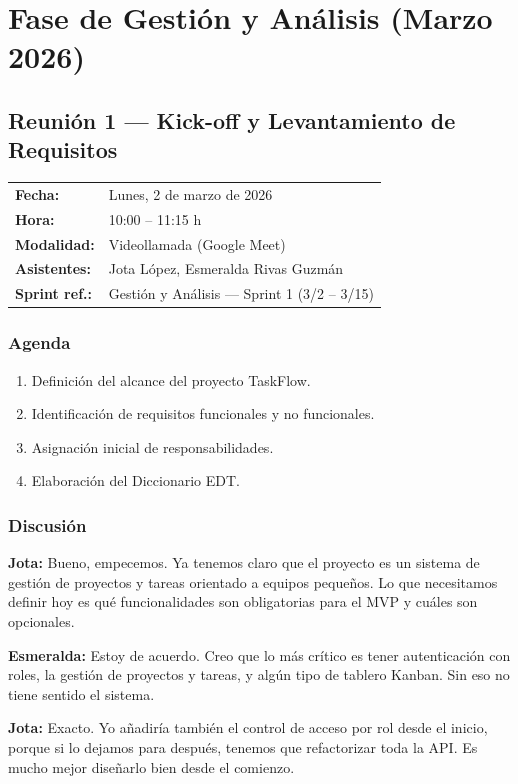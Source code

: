 \documentclass[12pt, a4paper]{article}
\makeatletter
\newcommand{\actaheader}[5]{%
  \begin{mdframed}[
    backgroundcolor=sectionbg,
    linecolor=bordercolor,
    linewidth=1pt,
    innerleftmargin=12pt, innerrightmargin=12pt,
    innertopmargin=10pt, innerbottommargin=10pt,
    skipabove=8pt, skipbelow=8pt
  ]
  \begin{tabularx}{\linewidth}{@{}lX@{}}
    \textbf{Fecha:}       & #1 \\[2pt]
    \textbf{Hora:}        & #2 \\[2pt]
    \textbf{Modalidad:}   & #3 \\[2pt]
    \textbf{Asistentes:}  & #4 \\[2pt]
    \textbf{Sprint ref.:} & #5 \\
  \end{tabularx}
  \end{mdframed}%
}
\newcommand{\jota}[1]{\noindent\textbf{\color{primary}Jota:} #1\par\smallskip}
\newcommand{\esme}[1]{\noindent\textbf{\color{accentgreen}Esmeralda:} #1\par\smallskip}
\makeatother
\begin{document}
\section{Fase de Gestión y Análisis (Marzo 2026)}

\subsection{Reunión 1 — Kick-off y Levantamiento de Requisitos}
\actaheader
  {Lunes, 2 de marzo de 2026}
  {10:00 -- 11:15 h}
  {Videollamada (Google Meet)}
  {Jota López, Esmeralda Rivas Guzmán}
  {Gestión y Análisis — Sprint 1 (3/2 -- 3/15)}

\subsubsection*{Agenda}
\begin{enumerate}[leftmargin=1.5em]
  \item Definición del alcance del proyecto TaskFlow.
  \item Identificación de requisitos funcionales y no funcionales.
  \item Asignación inicial de responsabilidades.
  \item Elaboración del Diccionario EDT.
\end{enumerate}

\subsubsection*{Discusión}

\jota{Bueno, empecemos. Ya tenemos claro que el proyecto es un sistema de gestión de proyectos y tareas orientado a equipos pequeños. Lo que necesitamos definir hoy es qué funcionalidades son obligatorias para el MVP y cuáles son opcionales.}

\esme{Estoy de acuerdo. Creo que lo más crítico es tener autenticación con roles, la gestión de proyectos y tareas, y algún tipo de tablero Kanban. Sin eso no tiene sentido el sistema.}

\jota{Exacto. Yo añadiría también el control de acceso por rol desde el inicio, porque si lo dejamos para después, tenemos que refactorizar toda la API. Es mucho mejor diseñarlo bien desde el comienzo.}
\end{document}
